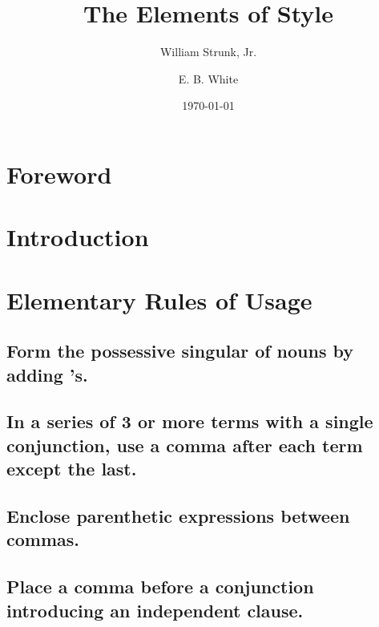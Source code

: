 \documentclass{article}
\title{The Elements of Style}
\author{William Strunk, Jr. \and E. B. White}
\date{\today}
\numberwithin{equation}{section}
\begin{document}
\maketitle
\tableofcontents


\section*{Foreword}


\section*{Introduction}


\section{Elementary Rules of Usage}

\subsection{Form the possessive singular of nouns by adding 's.}


\subsection{In a series of 3 or more terms with a single conjunction, use a comma after each term except the last.}


\subsection{Enclose parenthetic expressions between commas.}


\subsection{Place a comma before a conjunction introducing an independent clause.}
\end{document}
